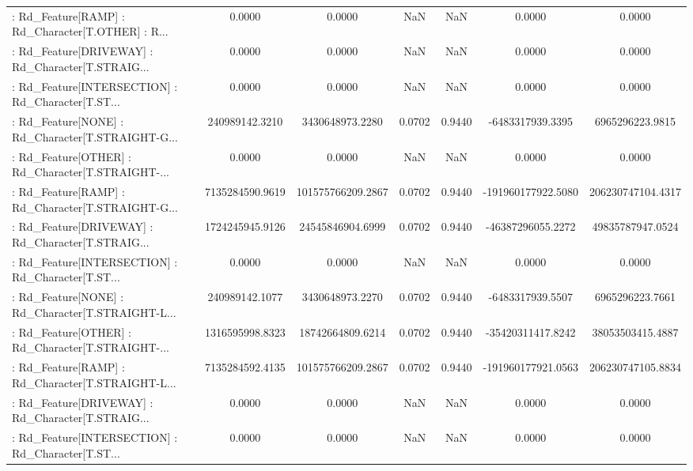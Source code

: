 \begin{longtable}{p{4cm}cccccc}
 : Rd\_Feature[RAMP] : Rd\_Character[T.OTHER] : R... &            0.0000 &            0.0000 &     NaN &          NaN &             0.0000 &            0.0000 \\
 : Rd\_Feature[DRIVEWAY] : Rd\_Character[T.STRAIG... &            0.0000 &            0.0000 &     NaN &          NaN &             0.0000 &            0.0000 \\
 : Rd\_Feature[INTERSECTION] : Rd\_Character[T.ST... &            0.0000 &            0.0000 &     NaN &          NaN &             0.0000 &            0.0000 \\
 : Rd\_Feature[NONE] : Rd\_Character[T.STRAIGHT-G... &    240989142.3210 &   3430648973.2280 &  0.0702 &       0.9440 &   -6483317939.3395 &   6965296223.9815 \\
 : Rd\_Feature[OTHER] : Rd\_Character[T.STRAIGHT-... &            0.0000 &            0.0000 &     NaN &          NaN &             0.0000 &            0.0000 \\
 : Rd\_Feature[RAMP] : Rd\_Character[T.STRAIGHT-G... &   7135284590.9619 & 101575766209.2867 &  0.0702 &       0.9440 & -191960177922.5080 & 206230747104.4317 \\
 : Rd\_Feature[DRIVEWAY] : Rd\_Character[T.STRAIG... &   1724245945.9126 &  24545846904.6999 &  0.0702 &       0.9440 &  -46387296055.2272 &  49835787947.0524 \\
 : Rd\_Feature[INTERSECTION] : Rd\_Character[T.ST... &            0.0000 &            0.0000 &     NaN &          NaN &             0.0000 &            0.0000 \\
 : Rd\_Feature[NONE] : Rd\_Character[T.STRAIGHT-L... &    240989142.1077 &   3430648973.2270 &  0.0702 &       0.9440 &   -6483317939.5507 &   6965296223.7661 \\
 : Rd\_Feature[OTHER] : Rd\_Character[T.STRAIGHT-... &   1316595998.8323 &  18742664809.6214 &  0.0702 &       0.9440 &  -35420311417.8242 &  38053503415.4887 \\
 : Rd\_Feature[RAMP] : Rd\_Character[T.STRAIGHT-L... &   7135284592.4135 & 101575766209.2867 &  0.0702 &       0.9440 & -191960177921.0563 & 206230747105.8834 \\
 : Rd\_Feature[DRIVEWAY] : Rd\_Character[T.STRAIG... &            0.0000 &            0.0000 &     NaN &          NaN &             0.0000 &            0.0000 \\
 : Rd\_Feature[INTERSECTION] : Rd\_Character[T.ST... &            0.0000 &            0.0000 &     NaN &          NaN &             0.0000 &            0.0000 \\

\end{longtable}
